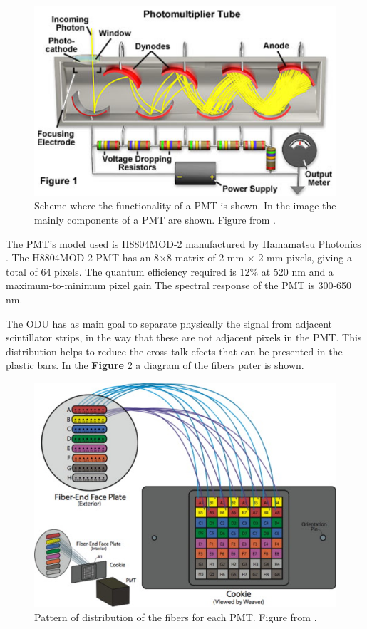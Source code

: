 \begin{figure}[!htb]
    \centering
    \includegraphics[scale=0.5]{Figures/Chapter2/PMT.png}
    \caption{Scheme where the functionality of a PMT is shown. In the image the mainly components of a PMT are shown. Figure from \cite{PMTHamamatsu}.}
    \label{fig:MnvExp:MnvDetector:PMTfunctionality}
\end{figure}



The PMT's model used is H8804MOD-2 manufactured by Hamamatsu Photonics \cite{hamamatsu2007photomultiplier}. The H8804MOD-2 PMT has an 8$\times$8 matrix of 2 mm $\times$ 2 mm pixels, giving a total of 64 pixels. The quantum efficiency required is 12\% at 520 nm and a maximum-to-minimum pixel gain  The spectral response of the PMT is 300-650 nm.    

The ODU has as main goal to separate physically the signal from adjacent scintillator strips, in the way that these are not adjacent pixels in the PMT. This distribution helps to reduce the cross-talk efects that can be presented in the plastic bars. In the \textbf{Figure} \ref{fig:MnvExp:MnvDetector:ODU} a diagram of the fibers pater is shown. 

\begin{figure}[!htb]
    \centering
    \includegraphics{Figures/Chapter2/ODU.jpg}
    \caption{Pattern of distribution of the fibers for each PMT. Figure from \cite{ALIAGA2014130}.}
    \label{fig:MnvExp:MnvDetector:ODU}
\end{figure}

